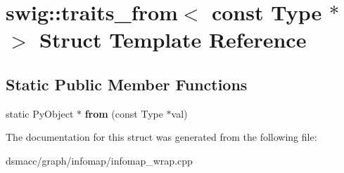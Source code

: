 \hypertarget{structswig_1_1traits__from_3_01const_01Type_01_5_01_4}{}\section{swig\+:\+:traits\+\_\+from$<$ const Type $\ast$ $>$ Struct Template Reference}
\label{structswig_1_1traits__from_3_01const_01Type_01_5_01_4}
\subsection*{Static Public Member Functions}
\begin{DoxyCompactItemize}
\item 
\mbox{\label{structswig_1_1traits__from_3_01const_01Type_01_5_01_4_ae36dbdb3c905af0dab508e7bf360a8d6}} 
static Py\+Object $\ast$ {\bfseries from} (const Type $\ast$val)
\end{DoxyCompactItemize}


The documentation for this struct was generated from the following file\+:\begin{DoxyCompactItemize}
\item 
dsmacc/graph/infomap/infomap\+\_\+wrap.\+cpp\end{DoxyCompactItemize}
